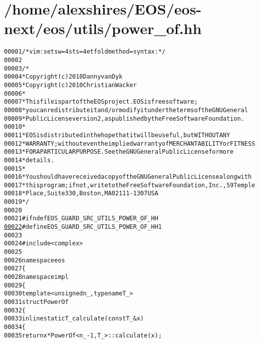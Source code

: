 \hypertarget{power__of_8hh_source}{
\section{/home/alexshires/EOS/eos-\/next/eos/utils/power\_\-of.hh}
}


\begin{footnotesize}\begin{alltt}
00001 \textcolor{comment}{/* vim: set sw=4 sts=4 et foldmethod=syntax : */}
00002 
00003 \textcolor{comment}{/*}
00004 \textcolor{comment}{ * Copyright (c) 2010 Danny van Dyk}
00005 \textcolor{comment}{ * Copyright (c) 2010 Christian Wacker}
00006 \textcolor{comment}{ *}
00007 \textcolor{comment}{ * This file is part of the EOS project. EOS is free software;}
00008 \textcolor{comment}{ * you can redistribute it and/or modify it under the terms of the GNU General}
00009 \textcolor{comment}{ * Public License version 2, as published by the Free Software Foundation.}
00010 \textcolor{comment}{ *}
00011 \textcolor{comment}{ * EOS is distributed in the hope that it will be useful, but WITHOUT ANY}
00012 \textcolor{comment}{ * WARRANTY; without even the implied warranty of MERCHANTABILITY or FITNESS}
00013 \textcolor{comment}{ * FOR A PARTICULAR PURPOSE.  See the GNU General Public License for more}
00014 \textcolor{comment}{ * details.}
00015 \textcolor{comment}{ *}
00016 \textcolor{comment}{ * You should have received a copy of the GNU General Public License along with}
00017 \textcolor{comment}{ * this program; if not, write to the Free Software Foundation, Inc., 59 Temple}
00018 \textcolor{comment}{ * Place, Suite 330, Boston, MA  02111-1307  USA}
00019 \textcolor{comment}{ */}
00020 
00021 \textcolor{preprocessor}{#ifndef EOS\_GUARD\_SRC\_UTILS\_POWER\_OF\_HH}
\hypertarget{power__of_8hh_source_l00022}{}\hyperlink{power__of_8hh_a62463aecc962f21a779b7750e2eab28d}{00022} \textcolor{preprocessor}{}\textcolor{preprocessor}{#define EOS\_GUARD\_SRC\_UTILS\_POWER\_OF\_HH 1}
00023 \textcolor{preprocessor}{}
00024 \textcolor{preprocessor}{#include <complex>}
00025 
00026 \textcolor{keyword}{namespace }eos
00027 \{
00028     \textcolor{keyword}{namespace }impl
00029     \{
00030         \textcolor{keyword}{template} <\textcolor{keywordtype}{unsigned} n\_, \textcolor{keyword}{typename} T\_>
00031         \textcolor{keyword}{struct }PowerOf
00032         \{
00033             \textcolor{keyword}{inline} \textcolor{keyword}{static} T\_ calculate(\textcolor{keyword}{const} T\_ & x)
00034             \{
00035                 \textcolor{keywordflow}{return} x * PowerOf<n\_ - 1, T\_>::calculate(x);

\end{alltt}
\end{footnotesize}
